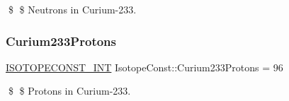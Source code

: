 \$ \$ Neutrons in Curium-\/233. \mbox{\label{group___isotope_const-_curium-_cm233_gaef973dea5c999bd8c6c96300e0dde23b}} 
\subsubsection{\texorpdfstring{Curium233\+Protons}{Curium233Protons}}
{\footnotesize\ttfamily \mbox{\hyperlink{group___isotope_const-_macros_ga5f18360b3e99483a35c32d789e62621c}{I\+S\+O\+T\+O\+P\+E\+C\+O\+N\+S\+T\+\_\+\+I\+NT}} Isotope\+Const\+::\+Curium233\+Protons = 96}

\$ \$ Protons in Curium-\/233. 